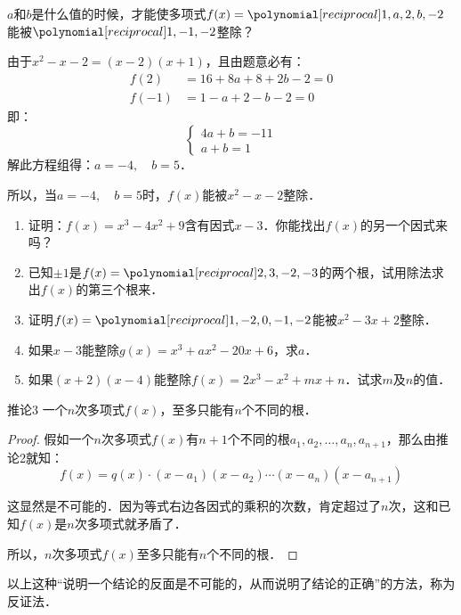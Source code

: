 \begin{example}
    $a$和$b$是什么值的时候，才能使多项式$f(x)=\poly{1,a,2,b,-2}$能被$\poly{1,-1,-2}$整除？
\end{example}

\begin{solution}
由于$x^2-x-2=(x-2)(x+1)$，且由题意必有：
\[\begin{split}
    f(2) &= 16+8a+8+2b-2=0\\
    f(-1)&=1-a+2-b-2=0
\end{split}\]
即：\[\begin{cases}
    4a+b=-11\\
    a+b=1
\end{cases}\]
解此方程组得：$a=-4,\quad b=5$．

所以，当$a=-4,\quad b=5$时，$f(x)$能被$x^2-x-2$整除．
\end{solution}

\begin{ex}
\begin{enumerate}
    \item 证明：$f(x)=x^3-4x^2+9$含有因式$x-3$．你能找出$f(x)$的另一个因式来吗？
    \item 已知$\pm 1$是$f(x)=\poly{2,3,-2,-3}$的两个根，试用除法求出$f(x)$的第三个根来．
    \item 证明$f(x)=\poly{1,-2,0,-1,-2}$能被$x^2-3x+2$整除．
    \item 如果$x-3$能整除$g(x)=x^3+ax^2-20x+6$，求$a$．
    \item 如果$(x+2)(x-4)$能整除$f(x)=2x^3-x^2+mx+n$．试求$m$及$n$的值．
\end{enumerate}
\end{ex}

\begin{blk}{推论3}
    一个$n$次多项式$f(x)$，至多只能有$n$个不同的根．
\end{blk}

\begin{proof}
假如一个$n$次多项式$f(x)$有$n+1$个不同的根$a_1,a_2,\ldots,a_n,a_{n+1}$，那么由推论2就知：
\[f (x) =q (x) \cdot  (x-a_1) (x-a_2)\cdots (x-a_n)(x-a_{n+1})\] 

这显然是不可能的．因为等式右边各因式的乘积的次数，肯定超过了$n$次，这和已知$f(x)$是$n$次多项式就矛盾了．

所以，$n$次多项式$f(x)$至多只能有$n$个不同的根．
\end{proof}

以上这种“说明一个结论的反面是不可能的，从而说明了结论的正确”的方法，称为反证法．

